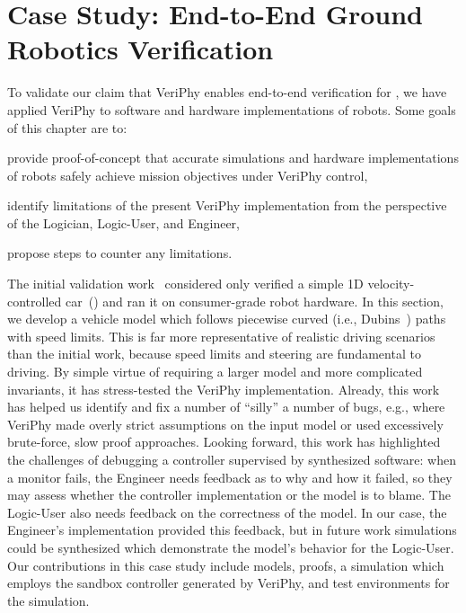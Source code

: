 \documentclass[12pt]{cmuthesis}
\theoremstyle{definition}
\theoremstyle{remark}
\newcommand{\rref}[2][]{\prettyref{#2}}
\newcommand{\VeriPhy}{VeriPhy\xspace}
\begin{document}
\section{Case Study: End-to-End Ground Robotics Verification}
\label{sec:ground-robotics}
To validate our claim that \VeriPhy enables end-to-end verification for \dL, we have applied \VeriPhy to software and hardware implementations of robots.
Some goals of this chapter are to:
\begin{inparaenum}[i)]
\item provide proof-of-concept that accurate simulations and hardware implementations of robots safely achieve mission objectives under \VeriPhy control,
\item identify limitations of the present \VeriPhy implementation from the perspective of the Logician, Logic-User, and Engineer,
\item propose steps to counter any limitations.
\end{inparaenum}
The initial validation work~\cite{DBLP:conf/pldi/BohrerTMMP18} considered only verified a simple 1D velocity-controlled car~(\rref{ex:driving-game}) and ran it on consumer-grade robot hardware.
In this section, we develop a vehicle model which follows piecewise curved (i.e., Dubins~\cite{citeulike:12223454}) paths with speed limits.
This is far more representative of realistic driving scenarios than the initial work, because speed limits and steering are fundamental to driving.
By simple virtue of requiring a larger model and more complicated invariants, it has stress-tested the \VeriPhy implementation.
Already, this work has helped us identify and fix a number of ``silly'' a number of bugs, e.g., where \VeriPhy made overly strict assumptions on the input model or used excessively brute-force, slow proof approaches.
Looking forward, this work has highlighted the challenges of debugging a controller supervised by synthesized software: when a monitor fails, the Engineer needs feedback as to why and how it failed, so they may assess whether the controller implementation or the model is to blame.
The Logic-User also needs feedback on the correctness of the model.
In our case, the Engineer's implementation provided this feedback, but in future work simulations could be synthesized which demonstrate the model's behavior for the Logic-User.
Our contributions in this case study include \dL models, proofs, a simulation which employs the sandbox controller generated by \VeriPhy, and test environments for the simulation.
\end{document}
